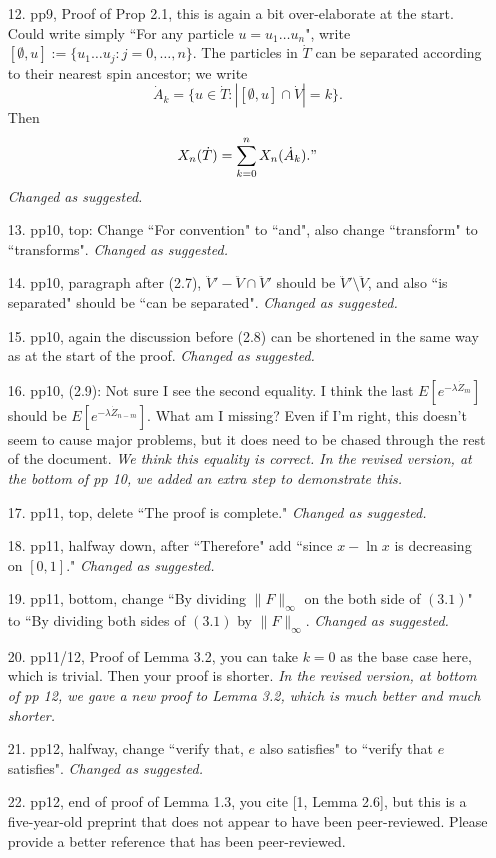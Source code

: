 \documentclass[12pt,a4paper]{amsart}
\numberwithin{equation}{section}
\begin{document}
\begin{itemize}
\\	
\item[12.]
	pp9, Proof of Prop 2.1, this is again a bit over-elaborate at the start. 
	Could write simply ``For any particle $u = u_1\dots u_n$", write $[\emptyset, u]:= \{u_1\dots u_j: j = 0,\dots, n\}$. 
	The particles in $\dot T$ can be separated according to their nearest spin ancestor; we write
\[
	\dot A_k = \{ u \in \dot T: |[\emptyset, u] \cap \dot V| = k\}.
\]
	Then
\[
	X_n(\dot T) = \sum_{k=0}^n X_n(\dot A_k). "
\]
	{\it Changed as suggested.}
\\	 
\item[13.]
	pp10, top: Change ``For convention" to ``and", also change ``transform" to ``transforms".
	{\it Changed as suggested.}
\\
\item[14.]
	pp10, paragraph after (2.7), $\ddot V' - \ddot V\cap \ddot V'$ should be $\ddot V'\setminus \ddot V$, and also ``is separated" should be ``can be separated".
	{\it Changed as suggested.}
\\
\item [15.]
	pp10, again the discussion before (2.8) can be shortened in the same way as at the start of the proof.
	{\it Changed as suggested.}	 
\\
\item [16.]
	pp10, (2.9): Not sure I see the second equality. 
	I think the last $E[e^{- \lambda \dot Z_m}]$ should be $E[e^{- \lambda \dot Z_{n-m}}]$. 
	What am I missing?
	Even if I'm right, this doesn't seem to cause major problems, but it does need to be chased through the rest of the document.
	{\it We think this equality is correct. 
	In the revised version, at the bottom of pp 10, we added an extra step to demonstrate this.}
\\
\item [17.]
	pp11, top, delete ``The proof is complete."
	{\it Changed as suggested.}
\\
\item [18.]
	pp11, halfway down, after ``Therefore" add ``since $x - \ln x$ is decreasing on $[0,1]$."
	{\it Changed as suggested.}
\\
\item [19.]
	pp11, bottom, change ``By dividing $\|F\|_\infty$ on the both side of $(3.1)$" to ``By dividing both sides of $(3.1)$ by $\|F\|_\infty$.
	{\it Changed as suggested.}
\\
\item [20.]
	pp11/12, Proof of Lemma 3.2, you can take $k = 0$ as the base case here, which is trivial. 
	Then your proof is shorter.
	{\it 
	In the revised version, at bottom of pp 12, we gave a new proof to Lemma 3.2, which is much better and much shorter. }
\\
\item [21.]
	pp12, halfway, change ``verify that, $e$ also satisfies" to ``verify that $e$ satisfies".
	{\it Changed as suggested.}
\\
\item[22.]
	pp12, end of proof of Lemma 1.3, you cite [1, Lemma 2.6], but this is a five-year-old preprint that does not appear to have been peer-reviewed. 
	Please provide a better reference that has been peer-reviewed.
	

\end{itemize}
\end{document}
